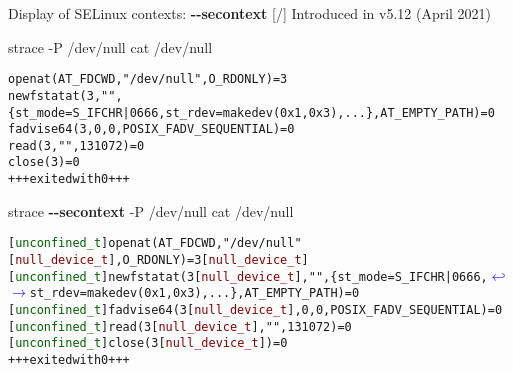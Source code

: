 \documentclass[unicode,aspectratio=169,xcolor={table,dvipsnames,usernames}]{beamer}
\newcommand{\symlinebreak}{\textcolor{blue}{\(\hookleftarrow\)}}
\newcommand{\symlinecont}{\textcolor{blue}{\(\longrightarrow\)}}
\begin{document}
\begin{frame}[fragile]{Display of SELinux contexts: \textbf{-{}-secontext} \hfill [\insertframenumber/\inserttotalframenumber]}
\large
Introduced in v5.12 (April 2021)
\begin{block}{strace -P /dev/null cat /dev/null}
\scriptsize
\begin{alltt}
openat(AT_FDCWD, "/dev/null", O_RDONLY) = 3
newfstatat(3, "", \{st_mode=S_IFCHR|0666, st_rdev=makedev(0x1, 0x3), ...\}, AT_EMPTY_PATH) = 0
fadvise64(3, 0, 0, POSIX_FADV_SEQUENTIAL) = 0
read(3, "", 131072)                     = 0
close(3)                                = 0
+++ exited with 0 +++
\end{alltt}
\end{block}
\large
\begin{block}{strace \textbf{-{}-secontext} -P /dev/null cat /dev/null}
\scriptsize
\begin{alltt}
[\textcolor{darkgreen}{unconfined_t}] openat(AT_FDCWD, "/dev/null" [\textcolor{darkred}{null_device_t}], O_RDONLY) = 3 [\textcolor{darkred}{null_device_t}]
[\textcolor{darkgreen}{unconfined_t}] newfstatat(3 [\textcolor{darkred}{null_device_t}], "", \{st_mode=S_IFCHR|0666, \symlinebreak
\symlinecont st_rdev=makedev(0x1, 0x3), ...\}, AT_EMPTY_PATH) = 0
[\textcolor{darkgreen}{unconfined_t}] fadvise64(3 [\textcolor{darkred}{null_device_t}], 0, 0, POSIX_FADV_SEQUENTIAL) = 0
[\textcolor{darkgreen}{unconfined_t}] read(3 [\textcolor{darkred}{null_device_t}], "", 131072) = 0
[\textcolor{darkgreen}{unconfined_t}] close(3 [\textcolor{darkred}{null_device_t}]) = 0
+++ exited with 0 +++
\end{alltt}
\end{block}
\end{frame}
\end{document}
